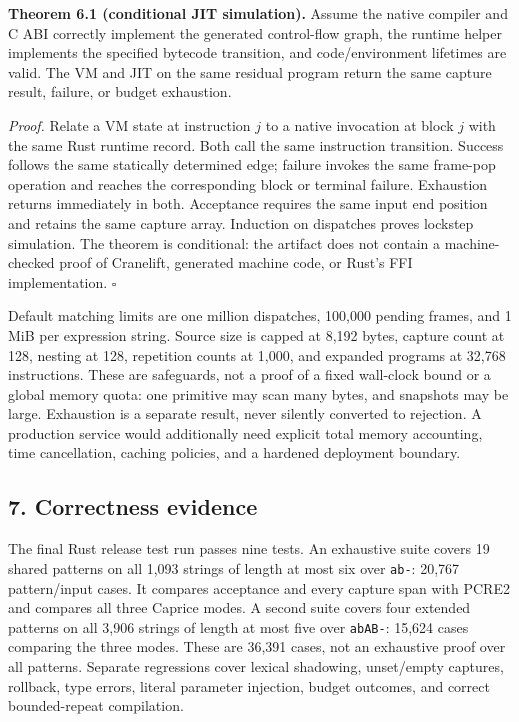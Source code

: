 \documentclass[
  11pt,
]{article}
\begin{document}
\textbf{Theorem 6.1 (conditional JIT simulation).} Assume the native
compiler and C ABI correctly implement the generated control-flow graph,
the runtime helper implements the specified bytecode transition, and
code/environment lifetimes are valid. The VM and JIT on the same
residual program return the same capture result, failure, or budget
exhaustion.

\emph{Proof.} Relate a VM state at instruction \(j\) to a native
invocation at block \(j\) with the same Rust runtime record. Both call
the same instruction transition. Success follows the same statically
determined edge; failure invokes the same frame-pop operation and
reaches the corresponding block or terminal failure. Exhaustion returns
immediately in both. Acceptance requires the same input end position and
retains the same capture array. Induction on dispatches proves lockstep
simulation. The theorem is conditional: the artifact does not contain a
machine-checked proof of Cranelift, generated machine code, or Rust's
FFI implementation. \(\square\)

Default matching limits are one million dispatches, 100,000 pending
frames, and 1 MiB per expression string. Source size is capped at 8,192
bytes, capture count at 128, nesting at 128, repetition counts at 1,000,
and expanded programs at 32,768 instructions. These are safeguards, not
a proof of a fixed wall-clock bound or a global memory quota: one
primitive may scan many bytes, and snapshots may be large. Exhaustion is
a separate result, never silently converted to rejection. A production
service would additionally need explicit total memory accounting, time
cancellation, caching policies, and a hardened deployment boundary.

\hypertarget{correctness-evidence}{%
\subsection{7. Correctness evidence}\label{correctness-evidence}}

The final Rust release test run passes nine tests. An exhaustive suite
covers 19 shared patterns on all 1,093 strings of length at most six
over \texttt{ab-}: 20,767 pattern/input cases. It compares acceptance
and every capture span with PCRE2 and compares all three Caprice modes.
A second suite covers four extended patterns on all 3,906 strings of
length at most five over \texttt{abAB-}: 15,624 cases comparing the
three modes. These are 36,391 cases, not an exhaustive proof over all
patterns. Separate regressions cover lexical shadowing, unset/empty
captures, rollback, type errors, literal parameter injection, budget
outcomes, and correct bounded-repeat compilation.
\end{document}
